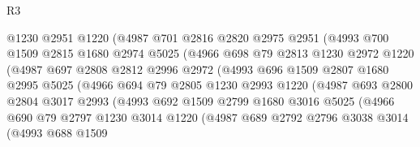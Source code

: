 \begin{lexlean}{R3}
\begin{coremodule}
                    @1230
                    @2951
                    @1220
                    (@4987
                      @701
                      @2816
                      @2820
                      @2975
                      @2951
                      (@4993
                        @700
                        @1509
                        @2815
                        @1680
                        @2974
                        @5025
                        (@4966
                          @698
                          @79
                          @2813
                          @1230
                          @2972
                          @1220
                          (@4987
                            @697
                            @2808
                            @2812
                            @2996
                            @2972
                            (@4993
                              @696
                              @1509
                              @2807
                              @1680
                              @2995
                              @5025
                              (@4966
                                @694
                                @79
                                @2805
                                @1230
                                @2993
                                @1220
                                (@4987
                                  @693
                                  @2800
                                  @2804
                                  @3017
                                  @2993
                                  (@4993
                                    @692
                                    @1509
                                    @2799
                                    @1680
                                    @3016
                                    @5025
                                    (@4966
                                      @690
                                      @79
                                      @2797
                                      @1230
                                      @3014
                                      @1220
                                      (@4987
                                        @689
                                        @2792
                                        @2796
                                        @3038
                                        @3014
                                        (@4993
                                          @688
                                          @1509

\end{coremodule}
\end{lexlean}
